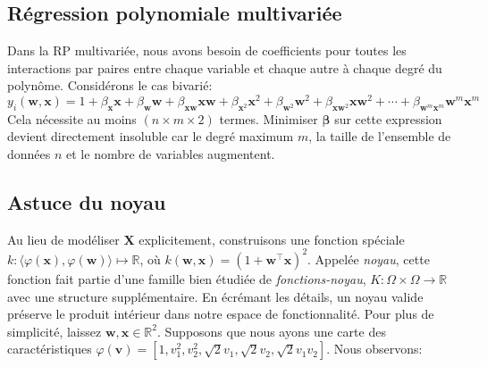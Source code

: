 \subsection{Régression polynomiale multivariée}

Dans la RP multivariée, nous avons besoin de coefficients pour toutes les interactions par paires entre chaque variable et chaque autre à chaque degré du polynôme. Considérons le cas bivarié:
%
\begin{equation}
    y_i(\mathbf w, \mathbf x) = 1 + \beta_{\mathbf x} \mathbf x + \beta_{\mathbf w}\mathbf w + \beta_{\mathbf x\mathbf w} \mathbf x\mathbf w + \beta_{\mathbf x^2} \mathbf x^2 + \beta_{\mathbf w^2} \mathbf w^2 + \beta_{\mathbf x\mathbf w^2} \mathbf x\mathbf w^2 + \cdots + \beta_{\mathbf w^m\mathbf x^m} \mathbf w^m\mathbf x^m
\end{equation}
%
Cela nécessite au moins $(n \times m \times 2)$ termes. Minimiser $\bm\beta$ sur cette expression devient directement insoluble car le degré maximum $m$, la taille de l'ensemble de données $n$ et le nombre de variables augmentent.

\subsection{Astuce du noyau}

Au lieu de modéliser $\mathbf X$ explicitement, construisons une fonction spéciale $k : \langle\varphi(\mathbf x), \varphi(\mathbf w)\rangle \mapsto \mathbb R$, où $k(\mathbf w, \mathbf x) = (1 + \mathbf w^\intercal \mathbf x)^2$. Appelée \textit{noyau}, cette fonction fait partie d'une famille bien étudiée de \textit{fonctions-noyau}, $K : \Omega \times \Omega \rightarrow \mathbb R$ avec une structure supplémentaire. En écrémant les détails, un noyau valide préserve le produit intérieur dans notre espace de fonctionnalité. Pour plus de simplicité, laissez $\mathbf w, \mathbf x \in \mathbb R^2$. Supposons que nous ayons une carte des caractéristiques $\varphi(\mathbf v) = \left[1, v_1^2, v_2^2, \sqrt{2} v_1, \sqrt{2} v_2, \sqrt{2} v_1 v_2\right]$. Nous observons:


